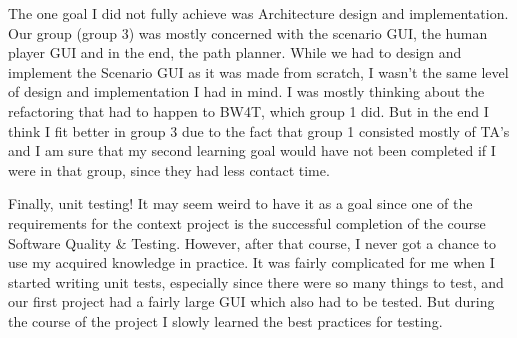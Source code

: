 \documentclass[a4paper]{article}
\begin{document}
The one goal I did not fully achieve was Architecture design and implementation. Our group (group 3) was mostly concerned with the scenario GUI, the human player GUI and in the end, the path planner. While we had to design and implement the Scenario GUI as it was made from scratch, I wasn't the same level of design and implementation I had in mind. I was mostly thinking about the refactoring that had to happen to BW4T, which group 1 did. But in the end I think I fit better in group 3 due to the fact that group 1 consisted mostly of TA's and I am sure that my second learning goal would have not been completed if I were in that group, since they had less contact time.

Finally, unit testing! It may seem weird to have it as a goal since one of the requirements for the context project is the successful completion of the course Software Quality \& Testing. However, after that course, I never got a chance to use my acquired knowledge in practice. It was fairly complicated for me when I started writing unit tests, especially since there were so many things to test, and our first project had a fairly large GUI which also had to be tested. But during the course of the project I slowly learned the best practices for testing.
\end{document}
